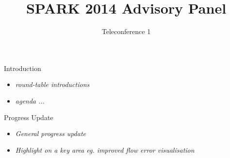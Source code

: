 \documentclass{beamer}
\title{SPARK 2014 Advisory Panel}
\subtitle{Teleconference 1}
\begin{document}
\begin{altrantitle}
\end{altrantitle}

\begin{frame}{Introduction}

  \begin{itemize}

  \item \emph{round-table introductions}
  \item \emph{agenda ...}

  \end{itemize}

  \end{frame}

\begin{frame}{Progress Update}

  \begin{itemize}

  \item \emph{General progress update}
  \item \emph{Highlight on a key area eg. improved flow error visualisation}

  \end{itemize}

\end{frame}
\end{document}
